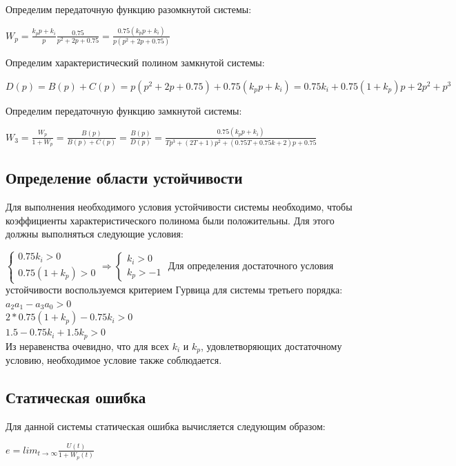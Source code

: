 \FloatBarrier
Определим передаточную функцию разомкнутой системы:

$W_p=\frac{k_pp+k_i}{p}\frac{0.75}{p^2 + 2p + 0.75}  =\frac{0.75(k_pp+k_i)}{p(p^2 + 2p + 0.75)}$

Определим характеристический полином замкнутой системы:

$D(p)=B(p)+C(p)=p(p^2 + 2p + 0.75)+0.75(k_pp+k_i)=0.75k_i + 0.75(1 + k_p)p + 2p^2 + p^3$

Определим передаточную функцию замкнутой системы:

$W_3=\frac{W_p}{1 + W_p}=\frac{B(p)}{B(p)+C(p)}=\frac{B(p)}{D(p)}=\frac{0.75(k_pp+k_i)}{Tp^3+(2T+1)p^2+(0.75T+0.75k+2)p+0.75} 
$

\subsection{Определение области устойчивости}

Для выполнения необходимого условия устойчивости системы необходимо, чтобы коэффициенты характеристического полинома были положительны. Для этого должны выполняться следующие условия:

\noindent$
\begin{cases}
	\text{$0.75k_i>0$} \\
	\text{$0.75(1 + k_p)>0$}
\end{cases}
\Longrightarrow
\begin{cases}
	\text{$k_i>0$} \\
	\text{$k_p>-1$}
\end{cases}
$
Для определения достаточного условия устойчивости воспользуемся критерием Гурвица для системы третьего порядка:\\
$a_2a_1-a_3a_0>0$ \\
$2*0.75(1 + k_p)-0.75k_i>0$ \\
$1.5 - 0.75 k_i + 1.5 k_p > 0$ \\


Из неравенства очевидно, что для всех $k_i$ и $k_p$, удовлетворяющих достаточному условию, необходимое условие также соблюдается.

\subsection{Статическая ошибка}

Для данной системы статическая ошибка вычисляется следующим образом:


$e=lim_{t\rightarrow\infty}\frac{U(t)}{1+W_p(t)}$

